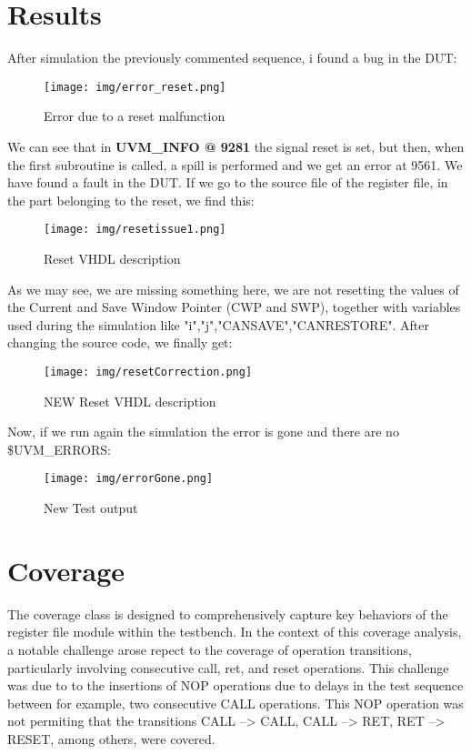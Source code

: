\documentclass[12pt,a4paper]{report}
\begin{document}
\section{Results}
After simulation the previously commented sequence, i found a bug in the DUT:

\begin{figure}[H]
\centering
\texttt{[image: img/error\_reset.png]}
\label{error reset}
\caption{Error due to a reset malfunction}
\end{figure}
\vspace{0.3cm}
We can see that in \textbf{UVM\_INFO @ 9281} the signal reset is set, but then, when the first subroutine is called, a spill is performed and we get an error at \@9561. We have found a fault in the DUT.
If we go to the source file of the register file, in the part belonging to the reset, we find this:

\begin{figure}[H]
\centering
\texttt{[image: img/resetissue1.png]}
\label{error resets}
\caption{Reset VHDL description}
\end{figure}
\vspace{0.3cm}

As we may see, we are missing something here, we are not resetting the values of the Current and Save Window Pointer (CWP and SWP), together with variables used during the simulation like "i","j","CANSAVE","CANRESTORE".
After changing the source code, we finally get:
\begin{figure}[H]
\centering
\texttt{[image: img/resetCorrection.png]}
\label{reset correction}
\caption{NEW Reset VHDL description}
\end{figure}
\vspace{0.3cm}
Now, if we run again the simulation the error is gone and there are no \$UVM\_ERRORS:
\begin{figure}[H]
\centering
\texttt{[image: img/errorGone.png]}
\label{error resets}
\caption{New Test output}
\end{figure}
\vspace{0.3cm}

\section{Coverage}
The coverage class is designed to comprehensively capture key behaviors of the register file module within the testbench. In the context of this coverage analysis, a notable challenge arose repect to the coverage of operation transitions, particularly involving consecutive call, ret, and reset operations. This challenge was due to to the insertions of NOP operations due to delays in the test sequence between for example, two consecutive CALL operations. This NOP operation was not permiting that the transitions CALL --> CALL, CALL --> RET, RET --> RESET, among others, were covered. 
\end{document}
